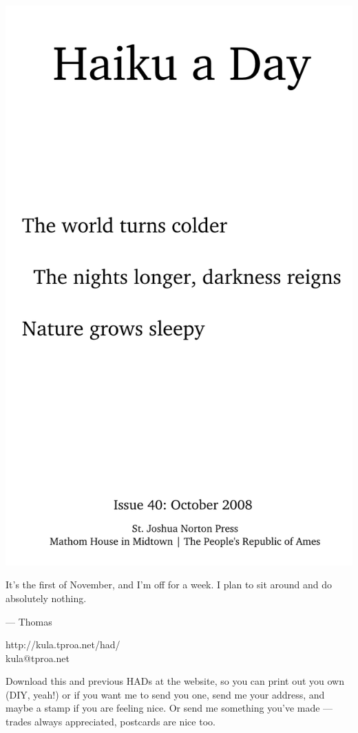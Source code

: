 \documentclass[12pt]{article}
\begin{document}
\includegraphics{frontpage.png}

\newpage

It's the first of November, and I'm off for a week. I plan to
sit around and do absolutely nothing.

--- Thomas

http://kula.tproa.net/had/ \\
kula@tproa.net

Download this and previous HADs at the website, so you can
print out you own (DIY, yeah!) or if you want me to send
you one, send me your address, and maybe a stamp if you
are feeling nice. Or send me something you've made ---
trades always appreciated, postcards are nice too.
\end{document}
